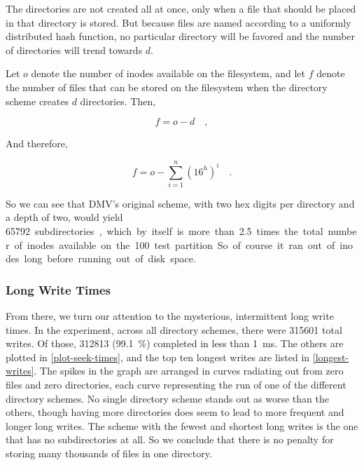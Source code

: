 The directories are not created all at once, only when a file that should be
placed in that directory is stored. But because files are named according to a
uniformly distributed hash function, no particular directory will be favored and
the number of directories will trend towards $d$.

Let $o$ denote the number of inodes available on the filesystem, and let $f$
denote the number of files that can be stored on the filesystem when the
directory scheme creates $d$ directories. Then,

\begin{equation}
    f = o-d \quad,
\end{equation}

And therefore,

\begin{equation}
    f = o - \sum_{i=1}^n \left( 16^h \right)^i \quad.
\end{equation}

So we can see that \gls{DMV}'s original scheme, with two hex digits per
directory and a depth of two, would yield \SI{65792} subdirectories, which by
itself is more than \num{2.5} times the total number of inodes available on the
\SI{100}{\mib} test partition. So of course it ran out of inodes long before
running out of disk space.


\subsubsection{Long Write Times}
\label{seek-times-results}

From there, we turn our attention to the mysterious, intermittent long write
times. In the experiment, across all directory schemes, there were \num{315601}
total writes. Of those, \num{312813} (\SI{99.1}{\percent}) completed in less
than \SI{1}{\ms}. The others are plotted in \autoref{plot-seek-times}, and the
top ten longest writes are listed in \autoref{longest-writes}. The spikes in the
graph are arranged in curves radiating out from zero files and zero directories,
each curve representing the run of one of the different directory schemes. No
single directory scheme stands out as worse than the others, though having more
directories does seem to lead to more frequent and longer long writes. The
scheme with the fewest and shortest long writes is the one that has no
subdirectories at all. So we conclude that there is no penalty for storing many
thousands of files in one directory.


